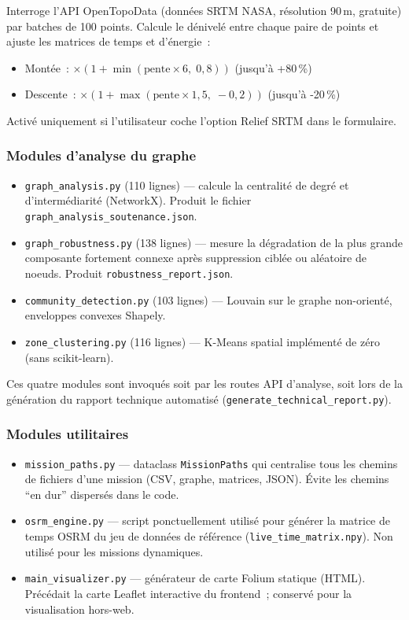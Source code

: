 \documentclass[a4paper, 12pt, twoside]{article}
\begin{document}
Interroge l'API OpenTopoData (donn\'{e}es SRTM NASA, r\'{e}solution 90\,m, gratuite) par
batches de 100 points. Calcule le d\'{e}nivel\'{e} entre chaque paire de points et ajuste
les matrices de temps et d'\'{e}nergie~:
\begin{itemize}
  \item Mont\'{e}e~: $\times (1 + \min(\text{pente} \times 6,\; 0{,}8))$ (jusqu'\`{a} +80\,\%)
  \item Descente~: $\times (1 + \max(\text{pente} \times 1{,}5,\; -0{,}2))$ (jusqu'\`{a} -20\,\%)
\end{itemize}
Activ\'{e} uniquement si l'utilisateur coche l'option \og Relief SRTM \fg{} dans le formulaire.

\subsubsection{Modules d'analyse du graphe}

\begin{itemize}
  \item \texttt{graph\_analysis.py} (110 lignes) --- calcule la centralit\'{e} de degr\'{e} et d'interm\'{e}diarit\'{e} (NetworkX). Produit le fichier \texttt{graph\_analysis\_soutenance.json}.
  \item \texttt{graph\_robustness.py} (138 lignes) --- mesure la d\'{e}gradation de la plus grande composante fortement connexe apr\`{e}s suppression cibl\'{e}e ou al\'{e}atoire de noeuds. Produit \texttt{robustness\_report.json}.
  \item \texttt{community\_detection.py} (103 lignes) --- Louvain sur le graphe non-orient\'{e}, enveloppes convexes Shapely.
  \item \texttt{zone\_clustering.py} (116 lignes) --- K-Means spatial impl\'{e}ment\'{e} de z\'{e}ro (sans scikit-learn).
\end{itemize}

Ces quatre modules sont invoqu\'{e}s soit par les routes API d'analyse, soit lors de
la g\'{e}n\'{e}ration du rapport technique automatis\'{e} (\texttt{generate\_technical\_report.py}).

\subsubsection{Modules utilitaires}

\begin{itemize}
  \item \texttt{mission\_paths.py} --- dataclass \texttt{MissionPaths} qui centralise tous les chemins de fichiers d'une mission (CSV, graphe, matrices, JSON). \'{E}vite les chemins ``en dur'' dispers\'{e}s dans le code.
  \item \texttt{osrm\_engine.py} --- script ponctuellement utilis\'{e} pour g\'{e}n\'{e}rer la matrice de temps OSRM du jeu de donn\'{e}es de r\'{e}f\'{e}rence (\texttt{live\_time\_matrix.npy}). Non utilis\'{e} pour les missions dynamiques.
  \item \texttt{main\_visualizer.py} --- g\'{e}n\'{e}rateur de carte Folium statique (HTML). Pr\'{e}c\'{e}dait la carte Leaflet interactive du frontend~; conserv\'{e} pour la visualisation hors-web.
\end{itemize}
\end{document}
